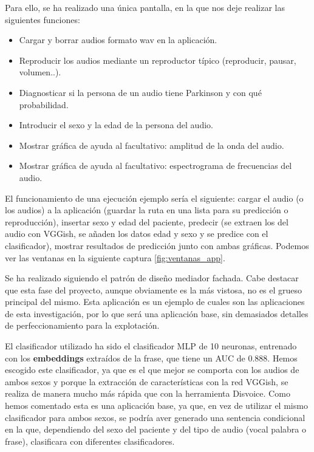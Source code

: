 Para ello, se ha realizado una única pantalla, en la que nos deje realizar las siguientes funciones:
\begin{itemize}
\item Cargar y borrar audios formato wav en la aplicación.
\item Reproducir los audios mediante un reproductor típico (reproducir, pausar, volumen..).
\item Diagnosticar si la persona de un audio tiene Parkinson y con qué probabilidad.
\item Introducir el sexo y la edad de la persona del audio.
\item Mostrar gráfica de ayuda al facultativo: amplitud de la onda del audio.
\item Mostrar gráfica de ayuda al facultativo: espectrograma de frecuencias del audio.
\end{itemize}

El funcionamiento de una ejecución ejemplo sería el siguiente: cargar el audio (o los audios) a la aplicación (guardar la ruta en una lista para su predicción o reproducción), insertar sexo y edad del paciente, predecir (se extraen los  del audio con VGGish, se añaden los datos edad y sexo y se predice con el clasificador), mostrar resultados de predicción junto con ambas gráficas. Podemos ver las ventanas en la siguiente captura \ref{fig:ventanas_app}.


Se ha realizado siguiendo el patrón de diseño mediador fachada. Cabe destacar que esta fase del proyecto, aunque obviamente es la más vistosa, no es el grueso principal del mismo. Esta aplicación es un ejemplo de cuales son las aplicaciones de esta investigación, por lo que será una aplicación base, sin demasiados detalles de perfeccionamiento para la explotación. 

El clasificador utilizado ha sido el clasificador MLP de 10 neuronas, entrenado con los \textbf{embeddings} extraídos de la frase, que tiene un AUC de 0.888. Hemos escogido este clasificador, ya que es el que mejor se comporta con los audios de ambos sexos y porque la extracción de características con la red VGGish, se realiza de manera mucho más rápida que con la herramienta Disvoice. Como hemos comentado esta es una aplicación base, ya que, en vez de utilizar el mismo clasificador para ambos sexos, se podría aver generado una sentencia condicional en la que, dependiendo del sexo del paciente y del tipo de audio (vocal palabra o frase), clasificara con diferentes clasificadores.